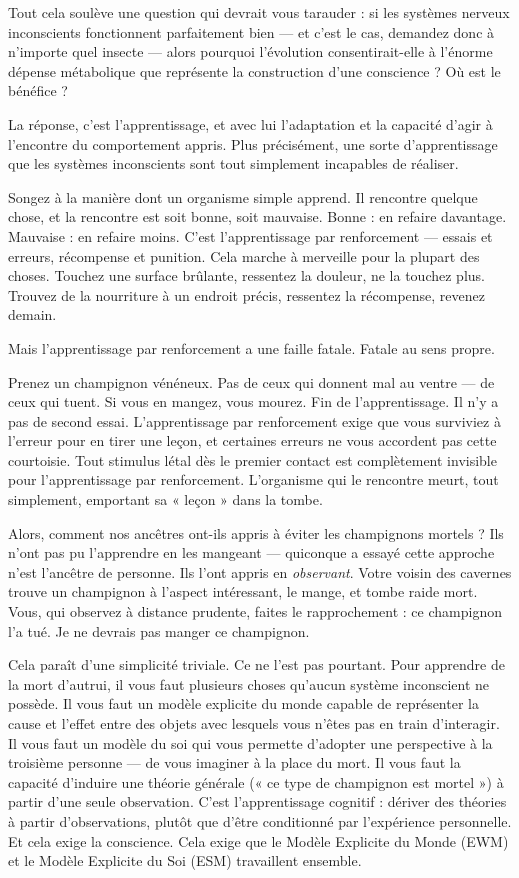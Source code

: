 \documentclass[11pt, twoside, openright]{book}
\begin{document}
Tout cela soulève une question qui devrait vous tarauder : si les systèmes nerveux inconscients fonctionnent parfaitement bien --- et c'est le cas, demandez donc à n'importe quel insecte --- alors pourquoi l'évolution consentirait-elle à l'énorme dépense métabolique que représente la construction d'une conscience ? Où est le bénéfice ?

La réponse, c'est l'apprentissage, et avec lui l'adaptation et la capacité d'agir à l'encontre du comportement appris. Plus précisément, une sorte d'apprentissage que les systèmes inconscients sont tout simplement incapables de réaliser.

Songez à la manière dont un organisme simple apprend. Il rencontre quelque chose, et la rencontre est soit bonne, soit mauvaise. Bonne : en refaire davantage. Mauvaise : en refaire moins. C'est l'apprentissage par renforcement --- essais et erreurs, récompense et punition. Cela marche à merveille pour la plupart des choses. Touchez une surface brûlante, ressentez la douleur, ne la touchez plus. Trouvez de la nourriture à un endroit précis, ressentez la récompense, revenez demain.

Mais l'apprentissage par renforcement a une faille fatale. Fatale au sens propre.

Prenez un champignon vénéneux. Pas de ceux qui donnent mal au ventre --- de ceux qui tuent. Si vous en mangez, vous mourez. Fin de l'apprentissage. Il n'y a pas de second essai. L'apprentissage par renforcement exige que vous surviviez à l'erreur pour en tirer une leçon, et certaines erreurs ne vous accordent pas cette courtoisie. Tout stimulus létal dès le premier contact est complètement invisible pour l'apprentissage par renforcement. L'organisme qui le rencontre meurt, tout simplement, emportant sa « leçon » dans la tombe.

Alors, comment nos ancêtres ont-ils appris à éviter les champignons mortels ? Ils n'ont pas pu l'apprendre en les mangeant --- quiconque a essayé cette approche n'est l'ancêtre de personne. Ils l'ont appris en \textit{observant}. Votre voisin des cavernes trouve un champignon à l'aspect intéressant, le mange, et tombe raide mort. Vous, qui observez à distance prudente, faites le rapprochement : ce champignon l'a tué. Je ne devrais pas manger ce champignon.

Cela paraît d'une simplicité triviale. Ce ne l'est pas pourtant. Pour apprendre de la mort d'autrui, il vous faut plusieurs choses qu'aucun système inconscient ne possède. Il vous faut un modèle explicite du monde capable de représenter la cause et l'effet entre des objets avec lesquels vous n'êtes pas en train d'interagir. Il vous faut un modèle du soi qui vous permette d'adopter une perspective à la troisième personne --- de vous imaginer à la place du mort. Il vous faut la capacité d'induire une théorie générale (« ce type de champignon est mortel ») à partir d'une seule observation. C'est l'apprentissage cognitif : dériver des théories à partir d'observations, plutôt que d'être conditionné par l'expérience personnelle. Et cela exige la conscience. Cela exige que le Modèle Explicite du Monde (EWM) et le Modèle Explicite du Soi (ESM) travaillent ensemble.
\end{document}
